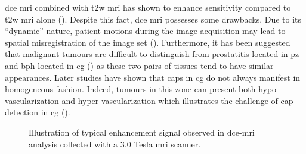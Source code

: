 \begin{enumerate}[leftmargin=*]
\ac{dce} \ac{mri} combined with \ac{t2w} \ac{mri} has shown to enhance sensitivity compared to \ac{t2w} \ac{mri} alone (\cite{Jager1997,Kim2005,Schlemmer2004,Zelhof2009}). Despite this fact, \ac{dce} \ac{mri} possesses some drawbacks. Due to its ``dynamic'' nature, patient motions during the image acquisition may lead to spatial misregistration of the image set (\cite{Verma2012}). Furthermore, it has been suggested that malignant tumours are difficult to distinguish from prostatitis located in \ac{pz} and \ac{bph} located in \ac{cg} (\cite{Hoeks2011,Verma2012}) as these two pairs of tissues tend to have similar appearances. Later studies have shown that \acp{cap} in \ac{cg} do not always manifest in homogeneous fashion. Indeed, tumours in this zone can present both hypo-vascularization and hyper-vascularization which illustrates the challenge of \ac{cap} detection in \ac{cg} (\cite{Niekerk2013}).

\begin{figure}
\centering
	\hspace*{\fill}
	 \hfill
	\hspace*{\fill}
	\caption{Illustration of typical enhancement signal observed in \ac{dce}-\ac{mri} analysis collected with a 3.0 Tesla \ac{mri} scanner.}
	\label{fig:dceana}
\end{figure}


\end{enumerate}
